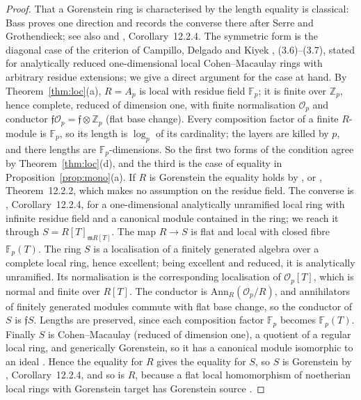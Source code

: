 \documentclass[11pt,a4paper]{article}
\theoremstyle{definition}
\newcommand{\ZZ}{\mathbb{Z}}
\newcommand{\FF}{\mathbb{F}}
\newcommand{\cO}{\mathcal{O}}
\newcommand{\cf}{\mathfrak{f}}
\begin{document}
\begin{proof}
That a Gorenstein ring is characterised by the length equality is classical: Bass proves one direction
\cite[Cor.~(6.5)]{Bas63} and records the converse there after Serre and Grothendieck; see also \cite{HK71} and
\cite{HS06}, Corollary~12.2.4. The symmetric form is the diagonal case of the criterion of Campillo, Delgado and
Kiyek \cite{CDK94}, (3.6)--(3.7), stated for analytically reduced one-dimensional local Cohen--Macaulay rings with
arbitrary residue extensions; we give a direct argument for the case at hand. By Theorem~\ref{thm:loc}(a), $R=A_p$ is local with residue field $\FF_p$; it is finite over $\ZZ_p$, hence complete,
reduced of dimension one, with finite normalisation $\cO_p$ and conductor $\cf\cO_p=\cf\otimes\ZZ_p$ (flat base
change). Every composition factor of a finite $R$-module is $\FF_p$, so its length is $\log_p$ of its cardinality; the
layers are killed by $p$, and there lengths are $\FF_p$-dimensions. So the first two forms of the condition agree
by Theorem~\ref{thm:loc}(d), and the third is the case of equality in Proposition~\ref{prop:mono}(a). If $R$ is Gorenstein the equality holds by
\cite[Cor.~(6.5)]{Bas63}, or \cite{HS06}, Theorem~12.2.2, which makes no assumption on the residue field. The converse
is \cite{HS06}, Corollary~12.2.4, for a one-dimensional analytically unramified local ring with infinite residue
field and a canonical module contained in the ring; we reach it through $S=R[T]_{\mathfrak mR[T]}$. The map $R\to S$
is flat and local with closed fibre $\FF_p(T)$. The ring $S$ is a localisation of a finitely generated algebra
over a complete local ring, hence excellent; being excellent and reduced, it is analytically unramified.
Its normalisation is the corresponding localisation of $\cO_p[T]$, which is normal and finite over $R[T]$. The
conductor is $\mathrm{Ann}_R(\cO_p/R)$, and annihilators of finitely generated modules commute with flat base
change, so the conductor of $S$ is $\cf S$. Lengths are preserved, since each composition factor $\FF_p$ becomes
$\FF_p(T)$. Finally $S$ is Cohen--Macaulay (reduced of dimension one), a quotient of a regular local ring, and generically
Gorenstein, so it has a canonical
module isomorphic to an ideal \cite[Thm.~3.3.6, Prop.~3.3.18(b)]{BH98}. Hence the equality for $R$ gives the equality for $S$, so $S$ is
Gorenstein by \cite{HS06}, Corollary~12.2.4, and so is $R$, because a flat local homomorphism of noetherian local
rings with Gorenstein target has Gorenstein source \cite[Tag~0BJL]{Stacks}.
\end{proof}
\end{document}
